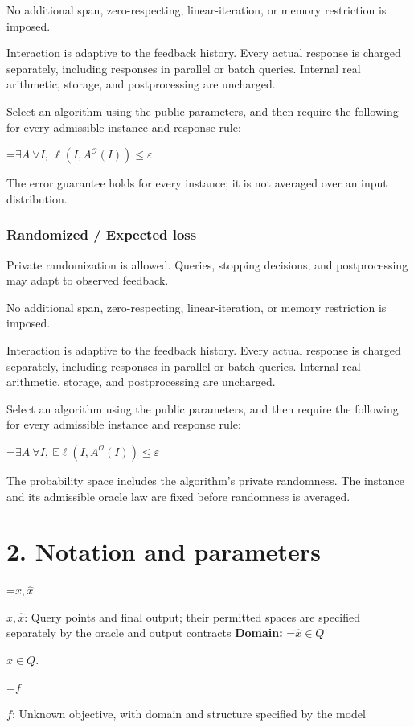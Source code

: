\documentclass[10pt,a4paper]{article}
\newcommand{\AtlasMath}[1]{\par\begingroup\centering\setbox0=\hbox{$\displaystyle #1$}\ifdim\wd0>1.4\linewidth\typeout{ATLAS WIDE FORMULA: \the\wd0}\fi\ifdim\wd0>\linewidth\resizebox{\linewidth}{!}{\box0}\else\box0\fi\par\endgroup}
\newcommand{\AtlasInlineMath}[1]{\begingroup\setbox0=\hbox{$#1$}\ifdim\wd0>.4\linewidth\endgroup\AtlasMath{#1}\else\endgroup$#1$\fi}
\begin{document}
No additional span, zero-respecting, linear-iteration, or memory restriction is imposed.

Interaction is adaptive to the feedback history. Every actual response is charged separately, including responses in parallel or batch queries. Internal real arithmetic, storage, and postprocessing are uncharged.

Select an algorithm using the public parameters, and then require the following for every admissible instance and response rule:


\AtlasMath{\exists A\ \forall I,\ \ell(I,A^\mathcal{O}(I))\le\varepsilon}


The error guarantee holds for every instance; it is not averaged over an input distribution.

\subsubsection{Randomized / Expected loss}
Private randomization is allowed. Queries, stopping decisions, and postprocessing may adapt to observed feedback.

No additional span, zero-respecting, linear-iteration, or memory restriction is imposed.

Interaction is adaptive to the feedback history. Every actual response is charged separately, including responses in parallel or batch queries. Internal real arithmetic, storage, and postprocessing are uncharged.

Select an algorithm using the public parameters, and then require the following for every admissible instance and response rule:


\AtlasMath{\exists A\ \forall I,\ \mathbb{E}\ell(I,A^\mathcal{O}(I))\le\varepsilon}


The probability space includes the algorithm's private randomness. The instance and its admissible oracle law are fixed before randomness is averaged.

\section{2. Notation and parameters}
\AtlasInlineMath{x,\widehat{x}}: Query points and final output; their permitted spaces are specified separately by the oracle and output contracts \textbf{Domain:} \AtlasInlineMath{\widehat{x}\in Q}.

\AtlasInlineMath{f}: Unknown objective, with domain and structure specified by the model
\end{document}
